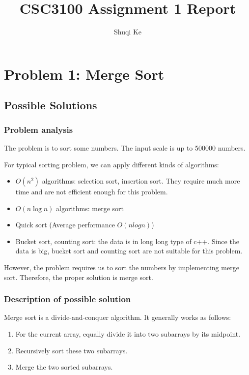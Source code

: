 \documentclass{report}
\author{Shuqi Ke}
\title{CSC3100 Assignment 1 Report}
\begin{document}
\maketitle
\tableofcontents

\chapter{Problem 1: Merge Sort}

\section{Possible Solutions}

\subsection{Problem analysis}

The problem is to sort some numbers. The input scale is up to 500000 numbers.

\noindent
For typical sorting problem, we can apply different kinds of algorithms:
\begin{itemize}
    \item $O(n^2)$ algorithms: selection sort, insertion sort. They require much more time and are not efficient enough for this problem.
    \item $O(n \log n)$ algorithms: merge sort
    \item Quick sort (Average performance $O(nlogn)$)
    \item Bucket sort, counting sort: the data is in long long type of c++. Since the data is big, bucket sort and counting sort are not suitable for this problem.
\end{itemize}

However, the problem requires us to sort the numbers by implementing merge sort.
Therefore, the proper solution is merge sort.

\subsection{Description of possible solution}

Merge sort is a divide-and-conquer algorithm. It generally works as follows:

\begin{enumerate}
    \item For the current array, equally divide it into two subarrays by its midpoint.
    \item Recursively sort these two subarrays.
    \item Merge the two sorted subarrays.
\end{enumerate}
\end{document}
